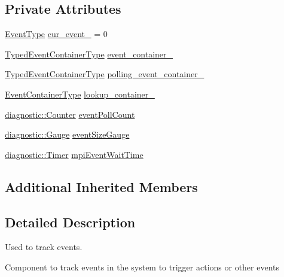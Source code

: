 \subsection*{Private Attributes}
\begin{DoxyCompactItemize}
\item 
\hyperlink{namespacevt_a009267401def7ae8bf201892222d060f}{Event\+Type} \hyperlink{structvt_1_1event_1_1_async_event_a8775e8bb7eee0344126af34897ca7612}{cur\+\_\+event\+\_\+} = 0
\item 
\hyperlink{structvt_1_1event_1_1_async_event_af0397f32fb9d7dd136c544737eeb7796}{Typed\+Event\+Container\+Type} \hyperlink{structvt_1_1event_1_1_async_event_ab976472ed1ec00878dfad854d0a74202}{event\+\_\+container\+\_\+}
\item 
\hyperlink{structvt_1_1event_1_1_async_event_af0397f32fb9d7dd136c544737eeb7796}{Typed\+Event\+Container\+Type} \hyperlink{structvt_1_1event_1_1_async_event_aa622d9e34d70a6de6ca74b16e65c1bae}{polling\+\_\+event\+\_\+container\+\_\+}
\item 
\hyperlink{structvt_1_1event_1_1_async_event_a391e9ac6236bd3dc5c884b8bc7e48257}{Event\+Container\+Type} \hyperlink{structvt_1_1event_1_1_async_event_a8810ca30cca503944aed2741a6d28430}{lookup\+\_\+container\+\_\+}
\item 
\hyperlink{namespacevt_1_1diagnostic_a55fcc9d6ffa285d1b085c01df2507d2f}{diagnostic\+::\+Counter} \hyperlink{structvt_1_1event_1_1_async_event_a2699d7c273fc91d9b7a3c51fbae364d9}{event\+Poll\+Count}
\item 
\hyperlink{namespacevt_1_1diagnostic_ad68069af499e2047c28d1852d77680ee}{diagnostic\+::\+Gauge} \hyperlink{structvt_1_1event_1_1_async_event_a8fc0ec877d847df0ac290c330146fd8a}{event\+Size\+Gauge}
\item 
\hyperlink{namespacevt_1_1diagnostic_a84795feb3d3500ee2d7d59248499efb8}{diagnostic\+::\+Timer} \hyperlink{structvt_1_1event_1_1_async_event_a09ed5cc72e0c43fa1de10ccb4effd7df}{mpi\+Event\+Wait\+Time}
\end{DoxyCompactItemize}
\subsection*{Additional Inherited Members}


\subsection{Detailed Description}
Used to track events. 

Component to track events in the system to trigger actions or other events 


